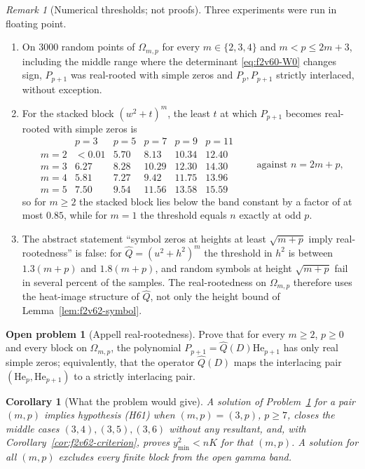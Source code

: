 \documentclass[11pt]{article}
\newtheorem{corollary}[theorem]{Corollary}
\theoremstyle{definition}
\newtheorem{problem}[theorem]{Open problem}
\theoremstyle{remark}
\newtheorem{remark}[theorem]{Remark}
\begin{document}
\begin{remark}[Numerical thresholds; not proofs]
\label{rem:f2v62-numerics}
Three experiments were run in floating point.
\begin{enumerate}[label=\textup{(\alph*)}]
\item On \(3000\) random points of \(\Omega_{m,p}\) for every
\(m\in\{2,3,4\}\) and \(m<p\le2m+3\), including the middle range where
the determinant \eqref{eq:f2v60-W0} changes sign, \(P_{p+1}\) was
real-rooted with simple zeros and \(P_p,P_{p+1}\) strictly interlaced,
without exception.
\item For the stacked block \((w^2+t)^m\), the least \(t\) at which
\(P_{p+1}\) becomes real-rooted with simple zeros is
\[
\begin{array}{c|cccccc}
 &p=3&p=5&p=7&p=9&p=11\\ \hline
 m=2&<0.01&5.70&8.13&10.34&12.40\\
 m=3&6.27&8.28&10.29&12.30&14.30\\
 m=4&5.81&7.27&9.42&11.75&13.96\\
 m=5&7.50&9.54&11.56&13.58&15.59
\end{array}
\qquad\text{against }n=2m+p,
\]
so for \(m\ge2\) the stacked block lies below the band constant by a
factor of at most \(0.85\), while for \(m=1\) the threshold equals
\(n\) exactly at odd \(p\).
\item The abstract statement ``symbol zeros at heights at least
\(\sqrt{m+p}\) imply real-rootedness'' is false: for
\(\widehat Q=(u^2+h^2)^m\) the threshold in \(h^2\) is between
\(1.3(m+p)\) and \(1.8(m+p)\), and random symbols at height
\(\sqrt{m+p}\) fail in several percent of the samples.  The
real-rootedness on \(\Omega_{m,p}\) therefore uses the heat-image
structure of \(\widehat Q\), not only the height bound of
Lemma~\ref{lem:f2v62-symbol}.
\end{enumerate}
\end{remark}

\begin{problem}[Appell real-rootedness]
\label{prob:f2v62-appell}
Prove that for every \(m\ge2\), \(p\ge0\) and every block on
\(\Omega_{m,p}\), the polynomial \(P_{p+1}=\widehat Q(D)\mathrm{He}_{p+1}\)
has only real simple zeros; equivalently, that the operator
\(\widehat Q(D)\) maps the interlacing pair
\((\mathrm{He}_p,\mathrm{He}_{p+1})\) to a strictly interlacing pair.
\end{problem}

\begin{corollary}[What the problem would give]
\label{cor:f2v62-consequences}
A solution of Problem~\ref{prob:f2v62-appell} for a pair \((m,p)\)
implies hypothesis (H61) when \((m,p)=(3,p)\), \(p\ge7\), closes the
middle cases \((3,4),(3,5),(3,6)\) without any resultant, and, with
Corollary~\ref{cor:f2v62-criterion}, proves \(y_{\min}^2<nK\) for that
\((m,p)\).  A solution for all \((m,p)\) excludes every finite block
from the open gamma band.
\end{corollary}
\end{document}
